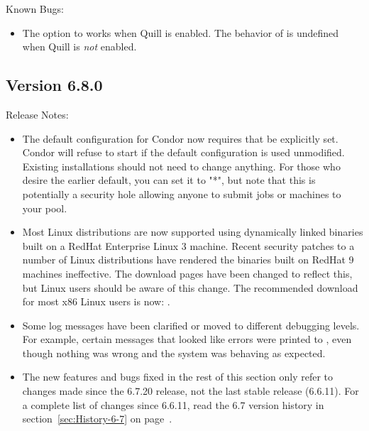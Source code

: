 \noindent Known Bugs:

\begin{itemize}

\item The  option to  works
when Quill is enabled.  The behavior of 
 is undefined when Quill is \emph{not}
enabled.

\end{itemize}




\subsection*{\label{sec:New-6-8-0}Version 6.8.0}

\noindent Release Notes:

\begin{itemize}

\item The default configuration for Condor now requires that
 be explicitly set.  Condor will refuse
to start if the default configuration is used unmodified.
Existing installations should not need to change anything.  For
those who desire the earlier default, you can set it to "*", but
note that this is potentially a security hole allowing anyone to
submit jobs or machines to your pool.

\item Most Linux distributions are now supported using dynamically
  linked binaries built on a RedHat Enterprise Linux 3 machine.
  Recent security patches to a number of Linux distributions have
  rendered the binaries built on RedHat 9 machines ineffective.
  The download pages have been changed to reflect this, but Linux users
  should be aware of this change.
  The recommended download for most x86 Linux users is now:
  .

\item Some log messages have been clarified or moved to different
  debugging levels.
  For example, certain messages that looked like errors were printed
  to , even though nothing was wrong and the system was
  behaving as expected.

\item The new features and bugs fixed in the rest of this section only
  refer to changes made since the 6.7.20 release, not the last stable
  release (6.6.11).
  For a complete list of changes since 6.6.11, read the 6.7 version
  history in section~\ref{sec:History-6-7} on
  page~\pageref{sec:History-6-7}. 

\end{itemize}


